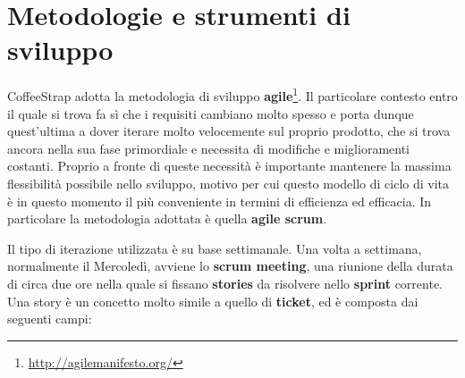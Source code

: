 \section{Metodologie e strumenti di sviluppo}

CoffeeStrap adotta la metodologia di sviluppo \textbf{\gls{agile}}\footnote{\url{http://agilemanifesto.org/}}. Il particolare contesto entro il quale si trova fa sì che i requisiti cambiano molto spesso e porta dunque quest'ultima a dover iterare molto velocemente sul proprio prodotto, che si trova ancora nella sua fase primordiale e necessita di modifiche e miglioramenti costanti. Proprio a fronte di queste necessità è importante mantenere la massima flessibilità possibile nello sviluppo, motivo per cui questo modello di ciclo di vita è in questo momento il più conveniente in termini di efficienza ed efficacia. In particolare la metodologia adottata è quella \textbf{agile \gls{scrum}}.

Il tipo di iterazione utilizzata è su base settimanale. Una volta a settimana, normalmente il Mercoledì, avviene lo \textbf{scrum meeting}, una riunione della durata di circa due ore nella quale si fissano \textbf{stories} da risolvere nello \textbf{\gls{sprint}} corrente. Una story è un concetto molto simile a quello di \textbf{ticket}, ed è composta dai seguenti campi:

